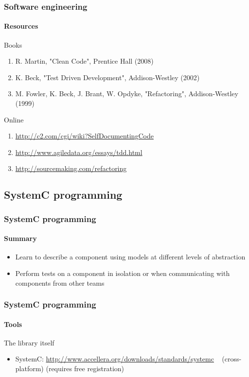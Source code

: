 \begin{frame}
\frametitle{Software engineering}
\framesubtitle{Resources}
\begin{block}{Books}
\begin{enumerate}
\item R. Martin, "Clean Code", Prentice Hall (2008)
\item K. Beck, "Test Driven Development", Addison-Westley (2002)
\item M. Fowler, K. Beck, J. Brant, W. Opdyke, "Refactoring", Addison-Westley (1999)
\end{enumerate}
\end{block}

\begin{block}{Online}
\begin{enumerate}
\item \url{http://c2.com/cgi/wiki?SelfDocumentingCode}
\item \url{http://www.agiledata.org/essays/tdd.html}
\item \url{http://sourcemaking.com/refactoring}
\end{enumerate}
\end{block}

\end{frame}

\subsection{SystemC programming}

\begin{frame}
\frametitle{SystemC programming}
\framesubtitle{Summary}

\begin{itemize}
\item Learn to describe a component using models at different levels of abstraction
\item Perform tests on a component in isolation or when communicating with components from other teams
\end{itemize}

\end{frame}

\begin{frame}
\frametitle{SystemC programming}
\framesubtitle{Tools}

\begin{block}{The library itself}
\begin{itemize}
\item SystemC: \url{http://www.accellera.org/downloads/standards/systemc} \,\,\, (cross-platform) (requires free registration)
\end{itemize}
\end{block}

\end{frame}

